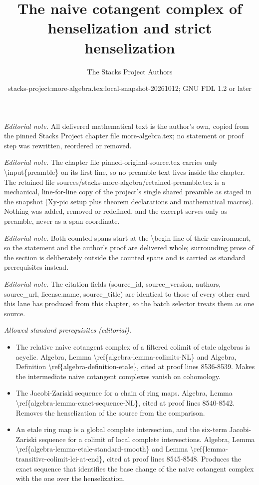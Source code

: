 \documentclass[10pt,a4paper]{amsart}
\title{The naive cotangent complex of henselization and strict henselization}
\author{The Stacks Project Authors}
\date{stacks-project:more-algebra.tex:local-snapshot-20261012; GNU FDL 1.2 or later}
\theoremstyle{plain}
\theoremstyle{definition}
\theoremstyle{remark}
\numberwithin{equation}{subsection}
\begin{document}
\maketitle
\setcounter{subsection}{1}
\noindent\textit{Editorial note.} All delivered mathematical text is the author's own, copied from the pinned Stacks Project chapter file more-algebra.tex; no statement or proof step was rewritten, reordered or removed.\par\medskip
\noindent\textit{Editorial note.} The chapter file pinned-original-source.tex carries only \textbackslash{}input\{preamble\} on its first line, so no preamble text lives inside the chapter. The retained file sources/stacks-more-algebra/retained-preamble.tex is a mechanical, line-for-line copy of the project's single shared preamble as staged in the snapshot (Xy-pic setup plus theorem declarations and mathematical macros). Nothing was added, removed or redefined, and the excerpt serves only as preamble, never as a span coordinate.\par\medskip
\noindent\textit{Editorial note.} Both counted spans start at the \textbackslash{}begin line of their environment, so the statement and the author's proof are delivered whole; surrounding prose of the section is deliberately outside the counted spans and is carried as standard prerequisites instead.\par\medskip
\noindent\textit{Editorial note.} The citation fields (source\_id, source\_version, authors, source\_url, license.name, source\_title) are identical to those of every other card this lane has produced from this chapter, so the batch selector treats them as one source.\par\medskip
\noindent\textit{Allowed standard prerequisites (editorial).}\begin{itemize}
\item The relative naive cotangent complex of a filtered colimit of etale algebras is acyclic. Algebra, Lemma \textbackslash{}ref\{algebra-lemma-colimits-NL\} and Algebra, Definition \textbackslash{}ref\{algebra-definition-etale\}, cited at proof lines 8536-8539. Makes the intermediate naive cotangent complexes vanish on cohomology.
\item The Jacobi-Zariski sequence for a chain of ring maps. Algebra, Lemma \textbackslash{}ref\{algebra-lemma-exact-sequence-NL\}, cited at proof lines 8540-8542. Removes the henselization of the source from the comparison.
\item An etale ring map is a global complete intersection, and the six-term Jacobi-Zariski sequence for a colimit of local complete intersections. Algebra, Lemma \textbackslash{}ref\{algebra-lemma-etale-standard-smooth\} and Lemma \textbackslash{}ref\{lemma-transitive-colimit-lci-at-end\}, cited at proof lines 8545-8548. Produces the exact sequence that identifies the base change of the naive cotangent complex with the one over the henselization.
\end{itemize}\medskip
\end{document}
